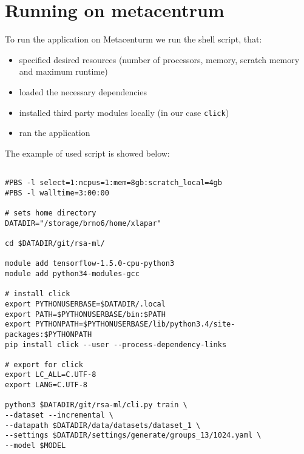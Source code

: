 \section*{Running on metacentrum}
\label{appendix-metacentrum}

To run the application on Metacenturm we run the shell script, that:

\begin{itemize}

\item specified desired resources (number of processors, memory, scratch memory and maximum runtime)

\item loaded the necessary dependencies

\item installed third party modules locally (in our case \texttt{click})

\item ran the application

\end{itemize}

\noindent
The example of used script is showed below:

\begin{verbatim}

#PBS -l select=1:ncpus=1:mem=8gb:scratch_local=4gb
#PBS -l walltime=3:00:00

# sets home directory
DATADIR="/storage/brno6/home/xlapar"

cd $DATADIR/git/rsa-ml/

module add tensorflow-1.5.0-cpu-python3
module add python34-modules-gcc

# install click
export PYTHONUSERBASE=$DATADIR/.local
export PATH=$PYTHONUSERBASE/bin:$PATH
export PYTHONPATH=$PYTHONUSERBASE/lib/python3.4/site-packages:$PYTHONPATH
pip install click --user --process-dependency-links

# export for click
export LC_ALL=C.UTF-8
export LANG=C.UTF-8

python3 $DATADIR/git/rsa-ml/cli.py train \
--dataset --incremental \
--datapath $DATADIR/data/datasets/dataset_1 \
--settings $DATADIR/settings/generate/groups_13/1024.yaml \
--model $MODEL

\end{verbatim}









